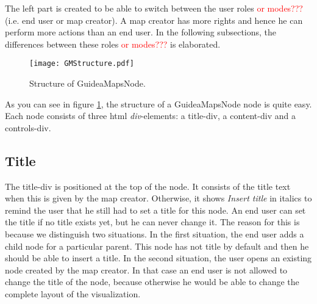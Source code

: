 The left part is created to be able to switch between the user roles \textcolor{red}{or modes???} (i.e. end user or map creator). A map creator has more rights and hence he can perform more actions than an end user. In the following subsections, the differences between these roles \textcolor{red}{or modes???} is elaborated.

\begin{figure}[H]
	\centering
	\texttt{[image: GMStructure.pdf]}
	\caption{Structure of GuideaMapsNode.}
	\label{fig:gmnodestructure}
\end{figure}

As you can see in figure \ref{fig:gmnodestructure}, the structure of a GuideaMapsNode node is quite easy. Each node consists of three html \textit{div}-elements: a title-div, a content-div and a controls-div.

\subsection{Title}
The title-div is positioned at the top of the node. It consists of the title text when this is given by the map creator. Otherwise, it shows \textit{Insert title} in italics to remind the user that he still had to set a title for this node. An end user can set the title if no title exists yet, but he can never change it. The reason for this is because we distinguish two situations. In the first situation, the end user adds a child node for a particular parent. This node has not title by default and then he should be able to insert a title. In the second situation, the user opens an existing node created by the map creator. In that case an end user is not allowed to change the title of the node, because otherwise he would be able to change the complete layout of the visualization. \\

